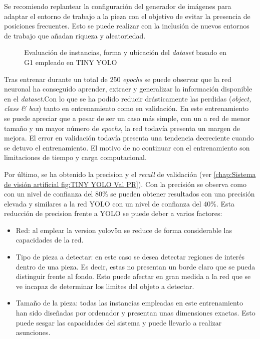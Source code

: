 Se recomiendo replantear la configuración del generador de imágenes para adaptar el entorno de trabajo a la pieza con el objetivo de evitar la presencia de posiciones frecuentes. Esto se puede realizar con la inclusión de nuevos entornos de trabajo que añadan riqueza y aleatoriedad.
	

\begin{figure}[ht]
  \hfill	
\caption{Evaluación de instancias, forma y ubicación del \textit{dataset} basado en G1 empleado en TINY YOLO}
\label{chap:Sistema de visión artificial fig:TINY YOLO labels}
\end{figure}

Tras entrenar durante un total de 250 \textit{epochs} se puede observar que la red neuronal ha conseguido aprender, extraer y generalizar la información disponible en el \textit{dataset}.Con lo que se ha podido reducir drásticamente las perdidas (\textit{object, class \& box}) tanto en entrenamiento como en validación. En este entrenamiento se puede apreciar que a pesar de ser un caso más simple, con un a red de menor tamaño y un mayor número de \textit{epochs}, la red todavía presenta un margen de mejora. El error en validación todavía presenta una tendencia decreciente cuando se detuvo el entrenamiento. El motivo de no continuar con el entrenamiento son limitaciones de tiempo y carga computacional.

Por último, se ha obtenido la precision y el \textit{recall} de validación (ver \autoref{chap:Sistema de visión artificial fig:TINY YOLO Val PR}). Con la precisión se observa como con un nivel de confianza del 80\% se pueden obtener resultados con una precisión elevada y similares a la red YOLO con un nivel de confianza del 40\%. Esta reducción de precision frente a YOLO se puede deber a varios factores:

\begin{itemize}
\item Red: al emplear la version yolov5n se reduce de forma considerable las capacidades de la red.
\item Tipo de pieza a detectar: en este caso se desea detectar regiones de interés dentro de una pieza. Es decir, estas no presentan un borde claro que se pueda distinguir frente al fondo. Esto puede afectar en gran medida a la red que se ve incapaz de determinar los limites del objeto a detectar.
\item Tamaño de la pieza: todas las instancias empleadas en este entrenamiento han sido diseñadas por ordenador y presentan unas dimensiones exactas. Esto puede sesgar las capacidades del sistema y puede llevarlo a realizar asunciones.
\end{itemize}

